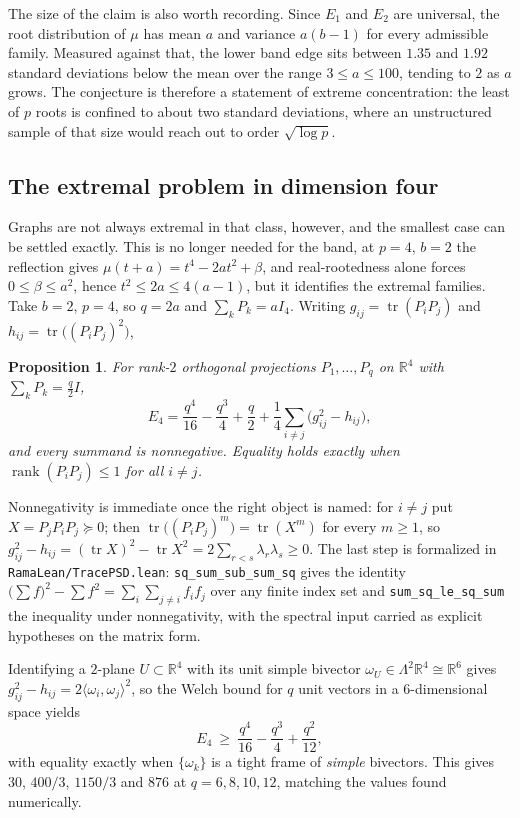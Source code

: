 \documentclass[11pt]{article}
\newtheorem{proposition}[theorem]{Proposition}
\theoremstyle{remark}
\begin{document}
The size of the claim is also worth recording. Since $E_1$ and $E_2$ are universal,
the root distribution of $\mu$ has mean $a$ and variance $a(b-1)$ for every
admissible family. Measured against that, the lower band edge sits between $1.35$
and $1.92$ standard deviations below the mean over the range $3\le a\le100$,
tending to $2$ as $a$ grows. The conjecture is therefore a statement of extreme
concentration: the least of $p$ roots is confined to about two standard deviations,
where an unstructured sample of that size would reach out to order
$\sqrt{\log p}$.

\subsection{The extremal problem in dimension four}

Graphs are not always extremal in that class, however, and the smallest case can be
settled exactly. This is no longer needed for the band, at $p=4$, $b=2$ the
reflection gives $\mu(t+a)=t^4-2at^2+\beta$, and real-rootedness alone forces
$0\le\beta\le a^2$, hence $t^2\le2a\le4(a-1)$, but it identifies the extremal
families. Take $b=2$, $p=4$, so $q=2a$ and $\sum_kP_k=aI_4$. Writing
$g_{ij}=\operatorname{tr}(P_iP_j)$ and $h_{ij}=\operatorname{tr}\bigl((P_iP_j)^2\bigr)$,

\begin{proposition}\label{prop:E4}
For rank-$2$ orthogonal projections $P_1,\dots,P_q$ on $\mathbb R^4$ with
$\sum_kP_k=\tfrac q2I$,
\[
E_4=\frac{q^4}{16}-\frac{q^3}{4}+\frac q2+\frac14\sum_{i\ne j}\bigl(g_{ij}^2-h_{ij}\bigr),
\]
and every summand is nonnegative. Equality holds exactly when
$\operatorname{rank}(P_iP_j)\le1$ for all $i\ne j$.
\end{proposition}

Nonnegativity is immediate once the right object is named: for $i\ne j$ put
$X=P_jP_iP_j\succeq0$; then $\operatorname{tr}\bigl((P_iP_j)^m\bigr)=\operatorname{tr}(X^m)$
for every $m\ge1$, so $g_{ij}^2-h_{ij}=(\operatorname{tr}X)^2-\operatorname{tr}X^2
=2\sum_{r<s}\lambda_r\lambda_s\ge0$. The last step is formalized in
\texttt{RamaLean/TracePSD.lean}: \texttt{sq\_sum\_sub\_sum\_sq} gives the identity
$\bigl(\sum f\bigr)^2-\sum f^2=\sum_i\sum_{j\ne i}f_if_j$ over any finite index set
and \texttt{sum\_sq\_le\_sq\_sum} the inequality under nonnegativity, with the
spectral input carried as explicit hypotheses on the matrix form.

Identifying a $2$-plane $U\subset\mathbb R^4$ with its unit simple bivector
$\omega_U\in\Lambda^2\mathbb R^4\cong\mathbb R^6$ gives
$g_{ij}^2-h_{ij}=2\langle\omega_i,\omega_j\rangle^2$, so the Welch bound for $q$
unit vectors in a $6$-dimensional space yields
\[
E_4\ \ge\ \frac{q^4}{16}-\frac{q^3}{4}+\frac{q^2}{12},
\]
with equality exactly when $\{\omega_k\}$ is a tight frame of \emph{simple}
bivectors. This gives $30$, $400/3$, $1150/3$ and $876$ at $q=6,8,10,12$, matching
the values found numerically.
\end{document}
